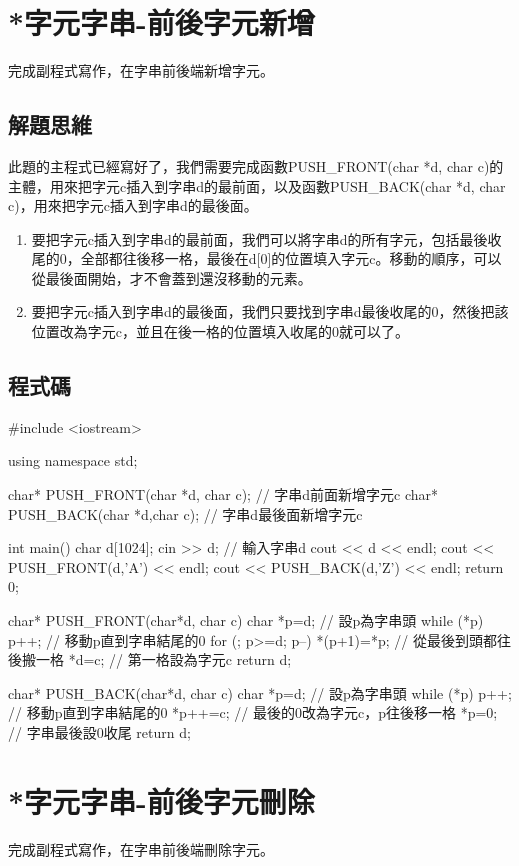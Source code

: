 \section{*字元字串-前後字元新增}
完成副程式寫作，在字串前後端新增字元。

\subsection{解題思維}
此題的主程式已經寫好了，我們需要完成函數PUSH\_FRONT(char *d, char c)的主體，用來把字元c插入到字串d的最前面，以及函數PUSH\_BACK(char *d, char c)，用來把字元c插入到字串d的最後面。

\vspace{0.3cm}
\begin{enumerate}
	\item 要把字元c插入到字串d的最前面，我們可以將字串d的所有字元，包括最後收尾的0，全部都往後移一格，最後在d[0]的位置填入字元c。移動的順序，可以從最後面開始，才不會蓋到還沒移動的元素。
	\item 要把字元c插入到字串d的最後面，我們只要找到字串d最後收尾的0，然後把該位置改為字元c，並且在後一格的位置填入收尾的0就可以了。
\end{enumerate}


\subsection{程式碼}
\begin{cppcode}
#include <iostream>

using namespace std; 

char* PUSH_FRONT(char *d, char c); // 字串d前面新增字元c
char* PUSH_BACK(char *d,char c); // 字串d最後面新增字元c

int main()
{ 
	char d[1024]; cin >> d; // 輸入字串d
	cout << d << endl;
	cout << PUSH_FRONT(d,'A') << endl;
	cout << PUSH_BACK(d,'Z') << endl;
	return 0;
} 

char* PUSH_FRONT(char*d, char c)
{
	char *p=d; // 設p為字串頭
	while (*p) p++; // 移動p直到字串結尾的0
	for (; p>=d; p--) *(p+1)=*p; // 從最後到頭都往後搬一格
	*d=c; // 第一格設為字元c
	return d;
}

char* PUSH_BACK(char*d, char c)
{
	char *p=d; // 設p為字串頭
	while (*p) p++; // 移動p直到字串結尾的0
	*p++=c; // 最後的0改為字元c，p往後移一格
	*p=0; // 字串最後設0收尾
	return d;
}
\end{cppcode}

\section{*字元字串-前後字元刪除}
完成副程式寫作，在字串前後端刪除字元。

